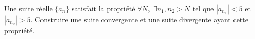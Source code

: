 
\begin{exercice}\label{exo0008}

Une suite réelle $\{a_n\}$ satisfait la propriété $\forall N, \; \exists n_1, n_2>N$ tel que $|a_{n_1}|<5$ et $|a_{n_2}|>5$.  Construire une suite convergente et une suite divergente ayant cette propriété.

\end{exercice}
